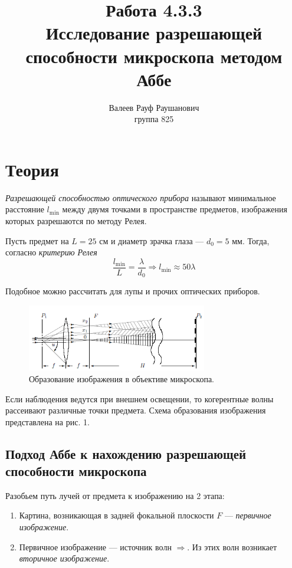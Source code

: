 \documentclass[a4paper, 12pt]{article}%
\author{Валеев Рауф Раушанович \\
группа 825}
\title{\textbf{Работа 4.3.3\\Исследование разрешающей способности микроскопа методом Аббе}}
\begin{document}
\maketitle
\section{Теория}
\textit{Разрешающей способностью оптического прибора} называют минимальное расстояние $l_{\min}$ между двумя точками в пространстве предметов, изображения которых разрешаются по методу Релея. 

Пусть предмет на $L = 25$ см и диаметр зрачка глаза --- $d_0 = 5$ мм. Тогда, согласно \textit{критерию Релея} 
\[\dfrac{l_{\min}}{L} = \dfrac{\lambda}{d_0} \Rightarrow l_{\min} \approx 50 \lambda\]

Подобное можно рассчитать для лупы и прочих оптических приборов.

\begin{figure}[h]
\begin{center}
\includegraphics[width = 0.7\textwidth]{1.png}
\caption{Образование изображения в объективе микроскопа.}
\end{center}
\end{figure}

Если наблюдения ведутся при внешнем освещении, то когерентные волны рассеивают различные точки предмета. Схема образования изображения представлена на рис. 1.

\subsection*{Подход Аббе к нахождению разрешающей способности микроскопа}
Разобьем путь лучей от предмета к изображению на 2 этапа:
\begin{enumerate}
\item Картина, возникающая в задней фокальной плоскости $F$ --- \textit{первичное изображение}. 
\item Первичное изображение --- источник волн $\Rightarrow$. Из этих волн возникает \textit{вторичное изображение}.
\end{enumerate}
\end{document}
